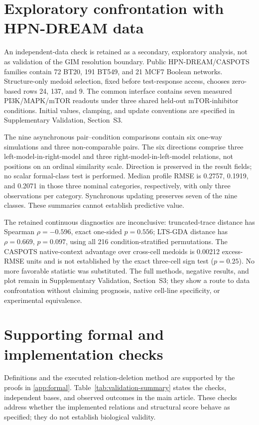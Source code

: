 \section{Exploratory confrontation with HPN-DREAM data}\label{sec:hpn-method}

An independent-data check is retained as a secondary, exploratory analysis,
not as validation of the GIM resolution boundary. Public HPN-DREAM/CASPOTS
families contain 72 BT20, 191 BT549, and 21 MCF7 Boolean networks.
Structure-only medoid selection, fixed before test-response access, chooses
zero-based rows 24, 137, and 9.\cite{Hill2016,Razzaq2018} The common interface
contains seven measured PI3K/MAPK/mTOR readouts under three shared held-out
mTOR-inhibitor conditions. Initial values, clamping, and update conventions
are specified in Supplementary Validation, Section~S3.

The nine asynchronous pair--condition comparisons contain six one-way
simulations and three non-comparable pairs. The six directions comprise three
left-model-in-right-model and three right-model-in-left-model relations, not
positions on an ordinal similarity scale. Direction is preserved in the result
fields; no scalar formal-class test is performed. Median profile RMSE is
0.2757, 0.1919, and 0.2071 in those three nominal categories, respectively,
with only three observations per category. Synchronous updating preserves
seven of the nine classes. These summaries cannot establish predictive value.

The retained continuous diagnostics are inconclusive: truncated-trace distance
has Spearman $\rho=-0.596$, exact one-sided $p=0.556$; LTS-GDA distance has
$\rho=0.669$, $p=0.097$, using all 216 condition-stratified permutations.
The CASPOTS native-context advantage over cross-cell medoids is 0.00212
excess-RMSE units and is not established by the exact three-cell sign test
($p=0.25$). No more favorable statistic was substituted. The full methods,
negative results, and plot remain in Supplementary Validation, Section~S3;
they show a route to data confrontation without claiming prognosis, native
cell-line specificity, or experimental equivalence.

\section{Supporting formal and implementation checks}
\label{sec:computational-validation}

Definitions and the executed relation-deletion method are supported by the
proofs in \ref{app:formal}. Table~\ref{tab:validation-summary} states
the checks, independent bases, and observed outcomes in the main article.
These checks address whether the implemented relations and structural score
behave as specified; they do not establish biological validity.

